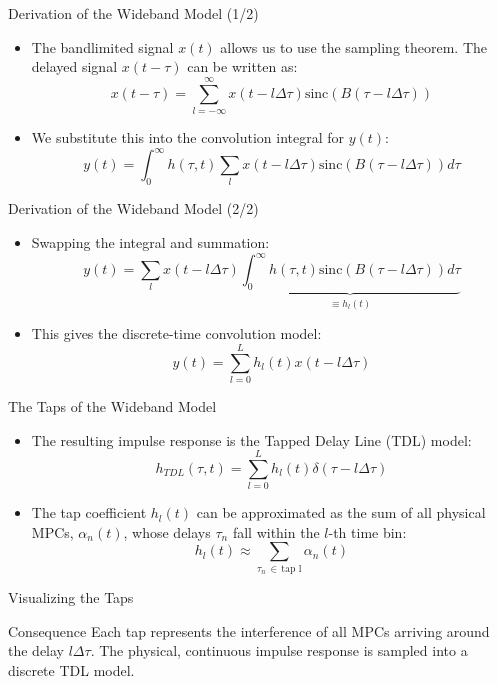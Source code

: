 \documentclass{beamer}
\begin{document}
	\begin{frame}{Derivation of the Wideband Model (1/2)}
		\begin{itemize}
			\item The bandlimited signal $x(t)$ allows us to use the sampling theorem. The delayed signal $x(t-\tau)$ can be written as:
			\[ x(t-\tau) = \sum_{l=-\infty}^{\infty} x(t-l\Delta\tau) \text{sinc}(B(\tau - l\Delta\tau)) \]
			
			\item We substitute this into the convolution integral for $y(t)$:
			\[ y(t) = \int_0^{\infty} h(\tau, t) \sum_{l} x(t-l\Delta\tau) \text{sinc}(B(\tau-l\Delta\tau)) d\tau \]
		\end{itemize}
	\end{frame}
	
	\begin{frame}{Derivation of the Wideband Model (2/2)}
		\begin{itemize}
			\item Swapping the integral and summation:
			\[ y(t) = \sum_{l} x(t-l\Delta\tau) \underbrace{\int_0^{\infty} h(\tau, t) \text{sinc}(B(\tau-l\Delta\tau)) d\tau}_{\equiv h_l(t)} \]
			
			\item This gives the discrete-time convolution model:
			\[ y(t) = \sum_{l=0}^{L} h_l(t) x(t-l\Delta\tau) \]
		\end{itemize}
	\end{frame}
	
	\begin{frame}{The Taps of the Wideband Model}
		\begin{itemize}
			\item The resulting impulse response is the Tapped Delay Line (TDL) model:
			\[ h_{TDL}(\tau, t) = \sum_{l=0}^{L} h_l(t) \delta(\tau - l\Delta\tau) \]
			
			\item The tap coefficient $h_l(t)$ can be approximated as the sum of all physical MPCs, $\alpha_n(t)$, whose delays $\tau_n$ fall within the $l$-th time bin:
			\[ h_l(t) \approx \sum_{\tau_n \, \in \, \text{tap l}} \alpha_n(t) \]
		\end{itemize}
	\end{frame}
	
	\begin{frame}{Visualizing the Taps}
		\begin{block}{Consequence}
			Each tap represents the interference of all MPCs arriving around the delay $l\Delta\tau$. The physical, continuous impulse response is sampled into a discrete TDL model.
		\end{block}
	\end{frame}
	
\end{document}
